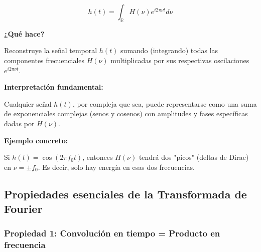 \documentclass[11pt,a4paper]{article}
\begin{document}
\begin{tcolorbox}[colback=verdeclaro!20,colframe=azuloscuro,title=\textbf{Transformada Inversa de Fourier}]
$$\boxed{h(t) = \int_{\mathbb{R}} H(\nu)e^{i2\pi\nu t}d\nu}$$

\textbf{¿Qué hace?}

Reconstruye la señal temporal $h(t)$ sumando (integrando) todas las componentes frecuenciales $H(\nu)$ multiplicadas por sus respectivas oscilaciones $e^{i2\pi\nu t}$.

\textbf{Interpretación fundamental:}

Cualquier señal $h(t)$, por compleja que sea, puede representarse como una suma de exponenciales complejas (senos y cosenos) con amplitudes y fases específicas dadas por $H(\nu)$.

\textbf{Ejemplo concreto:}

Si $h(t) = \cos(2\pi f_0 t)$, entonces $H(\nu)$ tendrá dos "picos" (deltas de Dirac) en $\nu = \pm f_0$. Es decir, solo hay energía en esas dos frecuencias.
\end{tcolorbox}

\subsection{Propiedades esenciales de la Transformada de Fourier}

\subsubsection{Propiedad 1: Convolución en tiempo = Producto en frecuencia}
\end{document}
